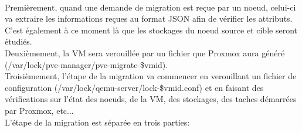 \documentclass[14pt]{extarticle}
\begin{document}
    \\
    Premièrement, quand une demande de migration est reçue par un noeud, celui-ci va extraire les informations reçues au format JSON afin de vérifier les attributs. C'est également à ce moment là que les stockages du noeud source et cible seront étudiés.\\
    Deuxièmement, la VM sera verouillée par un fichier que Proxmox aura généré (/var/lock/pve-manager/pve-migrate-\$vmid).\\
    Troisièmement, l'étape de la migration va commencer en verouillant un fichier de configuration (/var/lock/qemu-server/lock-\$vmid.conf) et en faisant des vérifications sur l'état des noeuds, de la VM, des stockages, des taches démarrées par Proxmox, etc...\\
    L'étape de la migration est séparée en trois parties:
\end{document}
